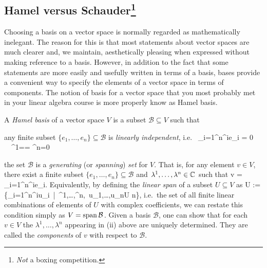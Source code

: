 \subsection[Hamel versus Schauder]{Hamel versus Schauder\protect\footnote{\emph{Not} a boxing competition.  }}

Choosing a basis on a vector space is normally regarded as mathematically inelegant. The reason for this is that most statements about vector spaces are much clearer and, we maintain, aesthetically pleasing when expressed without making reference to a basis. However, in addition to the fact that some statements are more easily and usefully written in terms of a basis, bases provide a convenient way to specify the elements of a vector space in terms of components.
The notion of basis for a vector space that you most probably met in your linear algebra course is more properly know as Hamel basis.

\bd
A \emph{Hamel basis} of a vector space $V$ is a subset $\mathcal{B}\subseteq V$ such that
\ben[label=(\roman*)]
\item any finite subset $\{e_1,\ldots,e_n\}\subseteq \mathcal{B}$ is \emph{linearly independent}, i.e.\
\bse
\sum_{i=1}^n\lambda^ie_i = 0 \ \Rightarrow \ \lambda^1=\cdots = \lambda^n=0
\ese
\item the set $\mathcal{B}$ is a \emph{generating} (or \emph{spanning}) \emph{set} for $V$. That is, for any element $v\in V$, there exist a finite subset $\{e_1,\ldots,e_n\}\subseteq \mathcal{B}$ and $\lambda^1,\ldots,\lambda^n\in\mathbb{C}$ such that
\bse
v = \sum_{i=1}^n\lambda^ie_i.
\ese
Equivalently, by defining the \emph{linear span} of a subset $U\subseteq V$ as
\bse
\lspan U := \biggl\{\sum_{i=1}^n\lambda^iu_i\ \Big|\ \lambda^1,\ldots,\lambda^n\in\C,\, u_1,\ldots,u_n\in U  n\biggr\},
\ese
i.e.\ the set of all finite linear combinations of elements of $U$ with complex coefficients, we can restate this condition simply as $V = \operatorname{span} \mathcal{B}$.
\een
\ed
Given a basis $\mathcal{B}$, one can show that for each $v\in V$ the $\lambda^1,\ldots,\lambda^n$ appearing in (ii) above are uniquely determined. They are called the \emph{components} of $v$ with respect to $\mathcal{B}$. 

